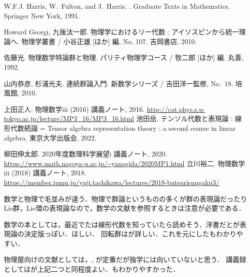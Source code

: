 \documentclass[dvipdfmx, a4paper, english]{jsarticle}
\theoremstyle{break}
\numberwithin{equation}{section}
\begin{document}
	
\begin{thebibliography}{Howa10}

W.F.J. Harris, W.~Fulton, and J.~Harris.
.
\newblock Graduate Texts in Mathematics. Springer New York, 1991.

Howard Georgi, 九後汰一郎.
\newblock 物理学におけるリー代数 : アイソスピンから統一理論へ.
\newblock 物理学叢書 / 小谷正雄 [ほか] 編, No. 107. 吉岡書店, 2010.

佐藤光.
\newblock 物理数学特論群と物理.
\newblock パリティ物理学コース / 牧二郎 [ほか] 編. 丸善, 1992.

山内恭彦, 杉浦光夫.
\newblock 連続群論入門.
\newblock 新数学シリーズ / 吉田洋一監修, No.~18. 培風館, 2010.

上田正人.
\newblock 物理数学iii (2016) 講義ノート, 2016.
\url{http://cat.phys.s.u-tokyo.ac.jp/lecture/MP3_16/MP3_16.html}
池田岳.
\newblock テンソル代数と表現論 : 線形代数続論 = Tensor algebra representation
  theory : a second course in linear algebra.
\newblock 東京大学出版会, 2022.

柳田伸太郎.
\newblock 2020年度数理科学展望i 講義ノート, 2020.
\url{https://www.math.nagoya-u.ac.jp/~yanagida/2020MP1.html}
立川裕二.
\newblock 物理数学iii (2018) 講義ノート, 2018.
\url{https://member.ipmu.jp/yuji.tachikawa/lectures/2018-butsurisuugaku3/}
\end{thebibliography}

	数学と物理で毛並みが違う．物理で群論というものの多くが群の表現論だったりLie群，Lie環の表現論なので，数学の文献を参照するときは注意が必要である．

	数学の本としては，最近でた\cite{BC13565134}は線形代数を知っていたら読めそう．洋書だと\cite{harris1991representation}が表現論の決定版っぽい．ほしい．
	回転群は\cite{BB03560137}が詳しい．これを元にした\cite{Yanagida:2020}もわかりやすい．

	物理屋向けの文献としては，\cite{BB03663366}, \cite{BN08491535}が定番だが独学には向いていないと思う．
	講義録としては\cite{Ueda:2016mp}が上記二つと同程度よい．\cite{Tachikawa:2018mp}もわかりやすかった．
\end{document}
